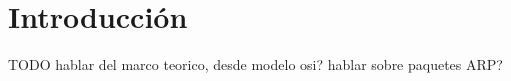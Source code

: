 \section{Introducción}

\PARstart 
TODO hablar del marco teorico, desde modelo osi? hablar sobre paquetes ARP?
